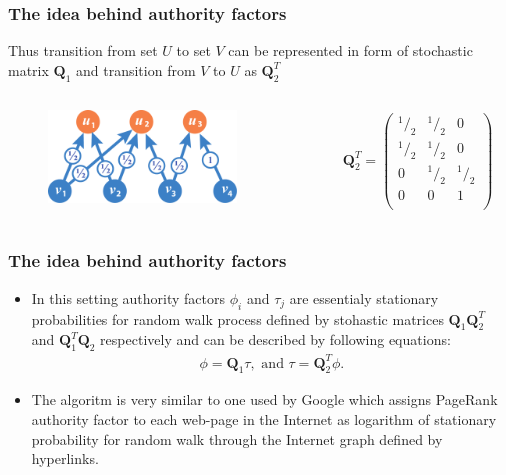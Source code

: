 \documentclass{beamer}
\newcommand{\mQ}{\mathbf{Q}}
\newcommand*\rfrac[2]{{}^{#1}\!/_{#2}}
\begin{document}
\begin{frame}
\frametitle{The idea behind authority factors}
Thus transition from set $U$ to set $V$ can be represented in form of
stochastic matrix $\mQ_1$ and transition from $V$ to $U$ as $\mQ_2^T$
\begin{columns}[T] %
\begin{column}{.48\textwidth}
\begin{figure}[h] 
    \includegraphics[width=5cm]{DemoGraphQ2.pdf}
\end{figure}
\end{column}%
\hfill%
\begin{column}{.48\textwidth}
\begin{eqnarray*}
\mQ_2^T = \left(
 \begin{array}{ccc}
    \rfrac{1}{2}& \rfrac{1}{2}& 0\\
    \rfrac{1}{2}& \rfrac{1}{2}& 0\\
    0& \rfrac{1}{2}& \rfrac{1}{2}\\
    0& 0& 1\\
  \end{array}
   \right)
\end{eqnarray*}
\end{column}%
\end{columns}


\end{frame}
\begin{frame}
\frametitle{The idea behind authority factors}
\begin{itemize}
  \item In this setting authority factors $\phi_i$ and $\tau_j$ are essentialy
stationary probabilities for random walk process defined by
stohastic matrices $\mQ_1\mQ_2^T$ and $\mQ_1^T\mQ_2$ respectively and can be
described by following equations:
 \begin{eqnarray*}
 \phi = \mQ_1 \tau, \text{ and } \tau = \mQ_2^T \phi.  
 \end{eqnarray*}
  \item The algoritm is very similar to one used by Google which assigns
PageRank authority factor to each web-page in the Internet as logarithm of stationary
probability for random walk through the Internet graph defined by hyperlinks.
\end{itemize}
\end{frame}
\end{document}
